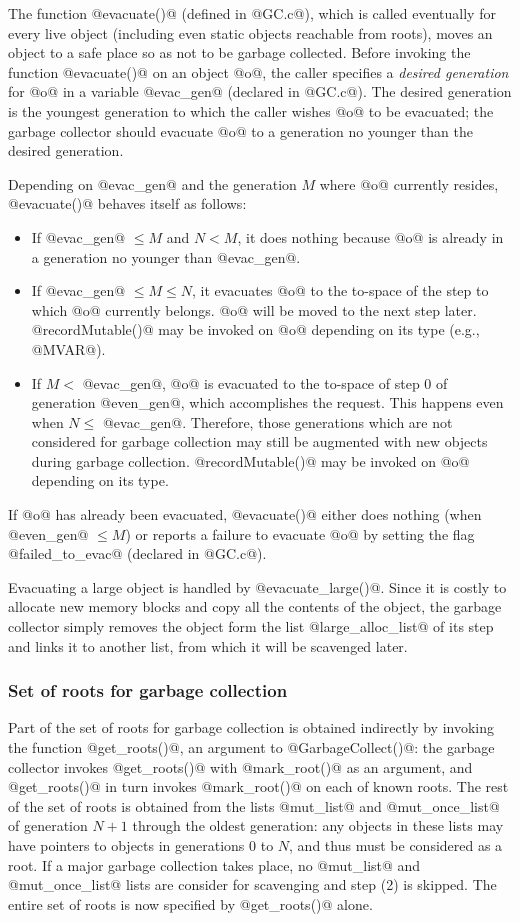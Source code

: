 \documentclass{article}
\begin{document}
The function @evacuate()@ (defined in @GC.c@), which 
is called eventually for every live object 
(including even static objects reachable from roots),
moves an object to
a safe place so as not to be garbage collected.
Before invoking the function @evacuate()@ on an object @o@, the caller specifies
a \emph{desired generation} for @o@ in a variable @evac_gen@
(declared in @GC.c@).
The desired generation is the youngest generation to which the caller wishes 
@o@ to be evacuated; the garbage collector should evacuate @o@ to a 
generation no younger than the desired generation.

Depending on @evac_gen@ and the generation $M$ where @o@ currently resides,
@evacuate()@ behaves itself as follows:
\begin{itemize}
\item If @evac_gen@ $\leq M$ and $N < M$, it does nothing because @o@ is already
      in a generation no younger than @evac_gen@.
\item If @evac_gen@ $\leq M \leq N$, it evacuates @o@ to the to-space of the 
step to which @o@ currently belongs. @o@ will be moved to the next step later.
@recordMutable()@ may be invoked on @o@ depending on its type (e.g., @MVAR@).
\item If $M <$ @evac_gen@, @o@ is evacuated to the to-space of step $0$
      of generation @even_gen@, which accomplishes the request.
      This happens even when $N \leq$ @evac_gen@. Therefore, those generations
      which are not considered for garbage collection may still be augmented
      with new objects during garbage collection.
      @recordMutable()@ may be invoked on @o@ depending on its type.
\end{itemize}
If @o@ has already been evacuated, @evacuate()@ either does nothing (when
@even_gen@ $\leq M$) or reports
a failure to evacuate @o@ by setting the flag @failed_to_evac@ (declared
in @GC.c@). 

Evacuating a large object is handled by @evacuate_large()@.  
Since it is costly to allocate new memory blocks and copy all the contents
of the object, the garbage collector simply removes the object form
the list @large_alloc_list@ of its step and links it to another list,
from which it will be scavenged later.

\subsubsection{Set of roots for garbage collection}
Part of the set of roots for garbage collection is obtained indirectly by 
invoking the function
@get_roots()@, an argument to @GarbageCollect()@: the garbage collector
invokes @get_roots()@ with @mark_root()@ as an argument, and @get_roots()@
in turn invokes @mark_root()@ on each of known roots.
The rest of the set of roots is obtained from the lists @mut_list@ and
@mut_once_list@ of generation $N + 1$ through the oldest generation:
any objects in these lists may have pointers to objects in generations
$0$ to $N$, and thus must be considered as a root.
If a major garbage collection takes place, no @mut_list@ and @mut_once_list@
lists are consider for scavenging and step (2) is skipped.
The entire set of roots is now specified by @get_roots()@ alone.
\end{document}
